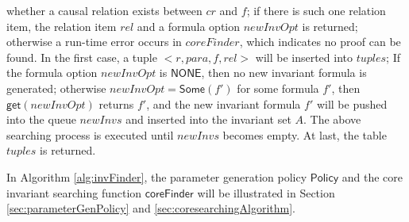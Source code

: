 \documentclass{llncs}
\newcommand\lyj[1]{\textcolor{magenta}{lyj: #1}}
\begin{document}
 whether  a causal relation exists between $cr$ and $f$; if there is such one relation item, the relation item $rel$ and a  formula option $newInvOpt$ is returned; otherwise a run-time error occurs in  $coreFinder$, which indicates no proof can be found. In the first case, a tuple $<r, para, f, rel>$ will be inserted into $tuples$; If the formula option $newInvOpt$ is $\mathsf{NONE}$, then no new invariant formula is generated; otherwise $newInvOpt=\mathsf{Some}(f')$ for some formula $f'$, then  $\mathsf{get}(newInvOpt)$ returns $f'$, and the new invariant formula $f'$ will be pushed into the queue $newInvs$ and inserted into the invariant set $A$.  The above searching process is executed until $newInvs$ becomes empty.  At last, the table $tuples$ is returned.





In Algorithm \ref{alg:invFinder}, the parameter generation policy $\mathsf{Policy}$  and the core invariant searching function $\mathsf{coreFinder}$ will be illustrated in Section \ref{sec:parameterGenPolicy} and \ref{sec:coresearchingAlgorithm}.
\end{document}
